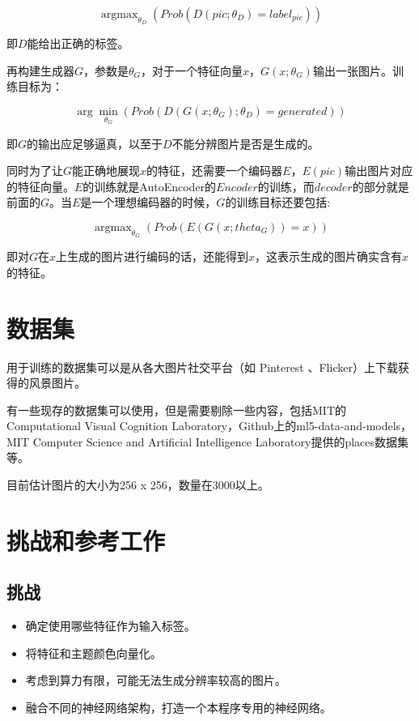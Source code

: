 \documentclass{article}
\begin{document}
$$\mathop{\arg\max}_{\theta_D}(Prob(D(pic; \theta_D)=label_{pic}))$$

即$D$能给出正确的标签。

再构建生成器$G$，参数是$\theta_G$，对于一个特征向量$x$，$G(x; \theta_G)$输出一张图片。训练目标为：

$$\arg\min_{\theta_G}(Prob(D(G(x; \theta_G); \theta_D)=generated))$$

即$G$的输出应足够逼真，以至于$D$不能分辨图片是否是生成的。

同时为了让$G$能正确地展现$x$的特征，还需要一个编码器$E$，$E(pic)$输出图片对应的特征向量。$E$的训练就是AutoEncoder的$Encoder$的训练，而$decoder$的部分就是前面的$G$。当$E$是一个理想编码器的时候，$G$的训练目标还要包括:

$$\mathop{\arg\max}_{\theta_G}(Prob(E(G(x; theta_G))=x))$$

即对$G$在$x$上生成的图片进行编码的话，还能得到$x$，这表示生成的图片确实含有$x$的特征。


\section{数据集}

用于训练的数据集可以是从各大图片社交平台（如 Pinterest 、Flicker）上下载获得的风景图片。

有一些现存的数据集可以使用，但是需要剔除一些内容，包括MIT的Computational Visual Cognition Laboratory，Github上的ml5-data-and-models，MIT Computer Science and Artificial Intelligence Laboratory提供的places数据集等。

目前估计图片的大小为256 x 256，数量在3000以上。

\section{挑战和参考工作}

\subsection{挑战}
\begin{itemize}
	\item 确定使用哪些特征作为输入标签。
	\item 将特征和主题颜色向量化。
	\item 考虑到算力有限，可能无法生成分辨率较高的图片。
	\item 融合不同的神经网络架构，打造一个本程序专用的神经网络。
\end{itemize}
\end{document}
